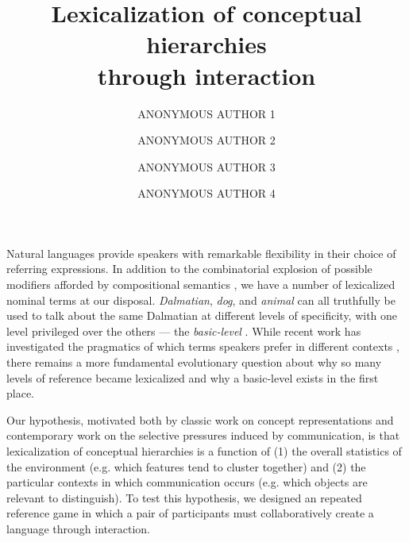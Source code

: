 \documentclass{evolang12}
\begin{document}
\title{Lexicalization of conceptual hierarchies \\ through interaction}
\author[1]{ANONYMOUS AUTHOR 1}
\author[1]{ANONYMOUS AUTHOR 2} 
\author[2]{ANONYMOUS AUTHOR 3}
\author[3]{ANONYMOUS AUTHOR 4}



\maketitle

Natural languages provide speakers with remarkable flexibility in their choice of referring expressions. In addition to the combinatorial explosion of possible modifiers afforded by compositional semantics \cite{Partee95_LexicalSemanticsCompositionality,VanDeemterEtAl12_ReferenceProduction,WintersKirbySmith14_LanguagesAdapt}, we have a number of lexicalized nominal terms at our disposal. \emph{Dalmatian}, \emph{dog}, and \emph{animal} can all truthfully be used to talk about the same Dalmatian at different levels of specificity, with one level privileged over the others --- the \emph{basic-level} \cite{RoschMervisGray___BoyesBraem76_BasicObjects}. While recent work has investigated the pragmatics of which terms speakers prefer in different contexts \cite{GrafEtAl16_BasicLevel}, there remains a more fundamental evolutionary question about why so many levels of reference became lexicalized and why a basic-level exists in the first place.

Our hypothesis, motivated both by classic work on concept representations and contemporary work on the selective pressures induced by communication, is that lexicalization of conceptual hierarchies is a function of (1) the overall statistics of the environment (e.g. which features tend to cluster together) and (2) the particular contexts in which communication occurs (e.g. which objects are relevant to distinguish). To test this hypothesis, we designed an repeated reference game in which a pair of participants must collaboratively create a language through interaction. 


 
\end{document}
